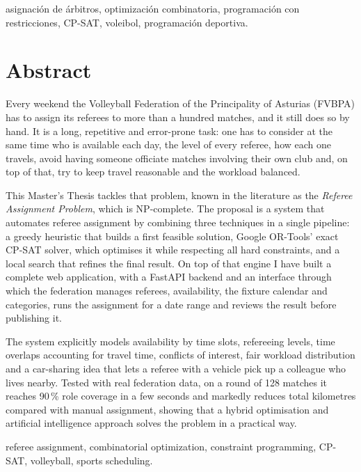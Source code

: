 \documentclass[11pt,a4paper,spanish]{book}
\numberwithin{equation}{chapter}
\numberwithin{figure}{chapter}
\numberwithin{table}{chapter}
\begin{document}
\vspace{0.5cm}
 asignación de árbitros, optimización combinatoria, programación con restricciones, CP-SAT, voleibol, programación deportiva.

\chapter{Abstract}

Every weekend the Volleyball Federation of the Principality of Asturias (FVBPA) has to assign its referees to more than a hundred matches, and it still does so by hand. It is a long, repetitive and error-prone task: one has to consider at the same time who is available each day, the level of every referee, how each one travels, avoid having someone officiate matches involving their own club and, on top of that, try to keep travel reasonable and the workload balanced.

This Master's Thesis tackles that problem, known in the literature as the \emph{Referee Assignment Problem}, which is NP-complete. The proposal is a system that automates referee assignment by combining three techniques in a single pipeline: a greedy heuristic that builds a first feasible solution, Google OR-Tools' exact CP-SAT solver, which optimises it while respecting all hard constraints, and a local search that refines the final result. On top of that engine I have built a complete web application, with a FastAPI backend and an interface through which the federation manages referees, availability, the fixture calendar and categories, runs the assignment for a date range and reviews the result before publishing it.

The system explicitly models availability by time slots, refereeing levels, time overlaps accounting for travel time, conflicts of interest, fair workload distribution and a car-sharing idea that lets a referee with a vehicle pick up a colleague who lives nearby. Tested with real federation data, on a round of 128 matches it reaches 90\,\% role coverage in a few seconds and markedly reduces total kilometres compared with manual assignment, showing that a hybrid optimisation and artificial intelligence approach solves the problem in a practical way.

\vspace{0.5cm}
 referee assignment, combinatorial optimization, constraint programming, CP-SAT, volleyball, sports scheduling.
\end{document}
